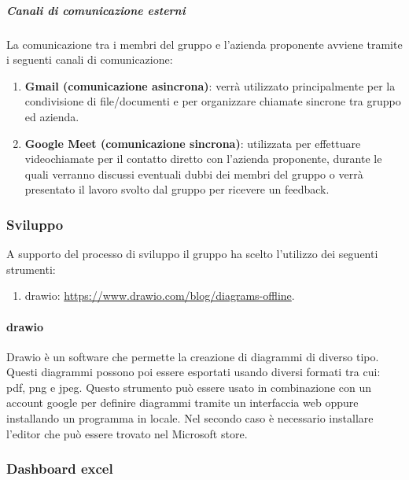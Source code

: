 \subparagraph{Canali di comunicazione esterni}
La comunicazione tra i membri del gruppo e l'azienda proponente avviene tramite i seguenti canali di comunicazione:
\begin{enumerate}
    \item \textbf{Gmail (comunicazione asincrona)}: verrà utilizzato principalmente per la condivisione di file/documenti e per organizzare chiamate sincrone tra gruppo ed azienda.

    \item \textbf{Google Meet (comunicazione sincrona)}: utilizzata per effettuare videochiamate per il contatto diretto con l'azienda proponente, durante le quali verranno discussi eventuali dubbi dei membri del gruppo o verrà presentato il lavoro svolto dal gruppo per ricevere un feedback.
\end{enumerate}

\subsubsection{Sviluppo}
A supporto del processo di sviluppo il gruppo ha scelto l'utilizzo dei seguenti strumenti:
\begin{enumerate}
    \item drawio: \href{https://www.drawio.com/blog/diagrams-offline}{https://www.drawio.com/blog/diagrams-offline}.
\end{enumerate}

\paragraph{drawio}
Drawio è un software che permette la creazione di diagrammi di diverso tipo.
Questi diagrammi possono poi essere esportati usando diversi formati tra cui: pdf, png e jpeg.
Questo strumento può essere usato in combinazione con un account google per definire diagrammi tramite un interfaccia web oppure installando un programma in locale.
Nel secondo caso è necessario installare l'editor che può essere trovato nel Microsoft store. 

\subsubsection{Dashboard excel}
